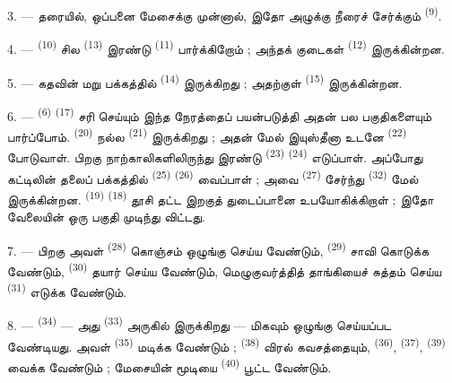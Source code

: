 3. --- தரையில், ஒப்பனை மேசைக்கு முன்னால், இதோ அழுக்கு நீரைச் சேர்க்கும்
 \textsuperscript{(9)}.

4. ---  \textsuperscript{(10)} சில  \textsuperscript{(13)} இரண்டு 
\textsuperscript{(11)} பார்க்கிறோம் ; அந்தக் குடைகள்  \textsuperscript{(12)} இருக்கின்றன.

5. --- கதவின் மறு பக்கத்தில்  \textsuperscript{(14)}
இருக்கிறது ; அதற்குள்  \textsuperscript{(15)} இருக்கின்றன.

6. ---  \textsuperscript{(6)} 
\textsuperscript{(17)} சரி செய்யும் இந்த நேரத்தைப் பயன்படுத்தி அதன் பல
பகுதிகளையும் பார்ப்போம். 
\textsuperscript{(20)} நல்ல  \textsuperscript{(21)}
இருக்கிறது ; அதன் மேல் இயுஸ்தீனா உடனே 
\textsuperscript{(22)} போடுவாள். பிறகு நாற்காலிகளிலிருந்து இரண்டு
 \textsuperscript{(23)}
 \textsuperscript{(24)} எடுப்பாள். அப்போது கட்டிலின்
தலைப் பக்கத்தில்  \textsuperscript{(25)}
 \textsuperscript{(26)} வைப்பாள் ; அவை
 \textsuperscript{(27)} சேர்ந்து
 \textsuperscript{(32)} மேல் இருக்கின்றன.
 \textsuperscript{(19)}  \textsuperscript{(18)} தூசி தட்ட இறகுத் துடைப்பானை
உபயோகிக்கிறாள் ; இதோ வேலையின் ஒரு பகுதி முடிந்து விட்டது.

7. --- பிறகு அவள்  \textsuperscript{(28)}
கொஞ்சம் ஒழுங்கு செய்ய வேண்டும், 
\textsuperscript{(29)} சாவி கொடுக்க வேண்டும், 
\textsuperscript{(30)} தயார் செய்ய வேண்டும், மெழுகுவர்த்தித் தாங்கியைச்
சுத்தம் செய்ய  \textsuperscript{(31)} எடுக்க
வேண்டும்.

\VUsaut{5.0mm}
\VUsaut{3.0mm}

8. ---  \textsuperscript{(34)} — அது  \textsuperscript{(33)} அருகில் இருக்கிறது — மிகவும் ஒழுங்கு
செய்யப்பட வேண்டியது. அவள்  \textsuperscript{(35)}
மடிக்க வேண்டும் ;  \textsuperscript{(38)}
விரல் கவசத்தையும்,  \textsuperscript{(36)},
 \textsuperscript{(37)}, 
\textsuperscript{(39)} வைக்க வேண்டும் ; மேசையின் மூடியை 
\textsuperscript{(40)} பூட்ட வேண்டும்.

